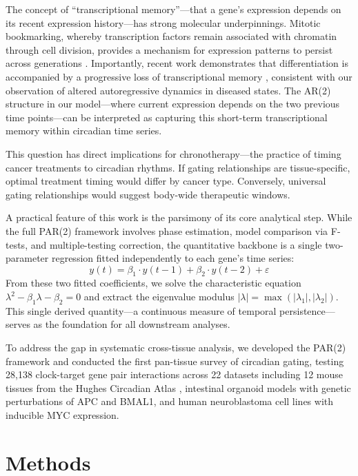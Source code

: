\documentclass[11pt,a4paper]{article}
\begin{document}
The concept of ``transcriptional memory''---that a gene's expression depends on its recent expression history---has strong molecular underpinnings. Mitotic bookmarking, whereby transcription factors remain associated with chromatin through cell division, provides a mechanism for expression patterns to persist across generations \citep{zaidi2010mitotic, zhu2023mitotic}. Importantly, recent work demonstrates that differentiation is accompanied by a progressive loss of transcriptional memory \citep{bmcbiol2024memory}, consistent with our observation of altered autoregressive dynamics in diseased states. The AR(2) structure in our model---where current expression depends on the two previous time points---can be interpreted as capturing this short-term transcriptional memory within circadian time series.

This question has direct implications for chronotherapy---the practice of timing cancer treatments to circadian rhythms. If gating relationships are tissue-specific, optimal treatment timing would differ by cancer type. Conversely, universal gating relationships would suggest body-wide therapeutic windows.

A practical feature of this work is the parsimony of its core analytical step. While the full PAR(2) framework involves phase estimation, model comparison via F-tests, and multiple-testing correction, the quantitative backbone is a single two-parameter regression fitted independently to each gene's time series:
\[
y(t) = \beta_1 \cdot y(t{-}1) + \beta_2 \cdot y(t{-}2) + \varepsilon
\]
From these two fitted coefficients, we solve the characteristic equation $\lambda^2 - \beta_1\lambda - \beta_2 = 0$ and extract the eigenvalue modulus $|\lambda| = \max(|\lambda_1|, |\lambda_2|)$. This single derived quantity---a continuous measure of temporal persistence---serves as the foundation for all downstream analyses.

To address the gap in systematic cross-tissue analysis, we developed the PAR(2) framework and conducted the first pan-tissue survey of circadian gating, testing 28,138 clock-target gene pair interactions across 22 datasets including 12 mouse tissues from the Hughes Circadian Atlas \citep{zhang2014}, intestinal organoid models with genetic perturbations of APC and BMAL1, and human neuroblastoma cell lines with inducible MYC expression.

\section{Methods}
\end{document}
